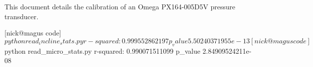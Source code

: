 \documentclass{article}
\title{\bf{Laboratory Project #1: Calibration of a Pressure Transducer}}
\author{Nicholas Malaya \\ Department of Mechanical Engineering \\ University of Texas at Austin} \date{}
\begin{document}
\maketitle

This document details the calibration of an Omega PX164-005D5V pressure transducer. 

[nick@magus code]$ python read_incline_stats.py 
r-squared: 0.999552862197
p_value 5.50240371955e-13


[nick@magus code]$ python read_micro_stats.py 
r-squared: 0.990071511099
p_value 2.84909524211e-08
\end{document}
